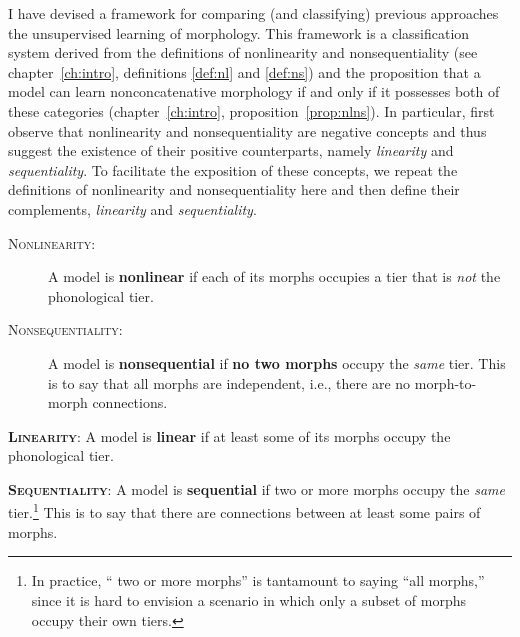 I have devised a framework for comparing (and classifying)
previous approaches
the unsupervised learning of morphology. This framework is a classification 
system derived from the definitions of nonlinearity and nonsequentiality 
(see chapter~\ref{ch:intro}, definitions \ref{def:nl} and \ref{def:ns}) 
and the proposition that 
a model can learn nonconcatenative morphology if and only if it 
possesses both of these categories (chapter~\ref{ch:intro}, 
proposition~\ref{prop:nlns}). In particular, first observe that nonlinearity 
and nonsequentiality are negative concepts and thus suggest the existence 
of their positive counterparts, namely \emph{linearity} and 
\emph{sequentiality}. To facilitate the exposition of these concepts, we 
repeat the definitions of nonlinearity and nonsequentiality here and 
then define their complements, \emph{linearity} and \emph{sequentiality}.
	\begin{description}%
	\item[{\textsc{Nonlinearity}}:]A model is 
	\textbf{nonlinear} if each of its morphs occupies a tier that is \emph{not} the phonological tier.
	\item[{\textsc{Nonsequentiality}}:]
	A model is \textbf{nonsequential} if \textbf{no two morphs} occupy the \emph{same} tier. This is to say that all morphs are independent, i.e., there are no morph-to-morph connections. 
	\end{description}
	\begin{definition}\label{def:l}{\textsc{\textbf{Linearity}}}:
	A model is \textbf{linear} if at least some of its morphs occupy the phonological tier.
	\end{definition}
	\begin{definition}\label{def:s}{\textsc{\textbf{Sequentiality}}}:
A model is \textbf{sequential} if two or more morphs occupy the \emph{same} tier.\footnote{In practice, `` two or more morphs'' is tantamount to saying ``all morphs,'' since it is hard to envision a scenario in which only a subset of morphs occupy their own tiers.} This is to say that there are connections between at least some pairs of morphs.
	\end{definition}

